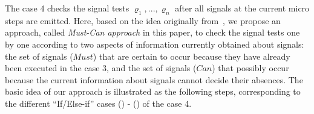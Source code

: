 \documentclass{fcs}
\newcommand{\rmn}[1]{(\romannumeral#1)}
\newcommand{\Must}[0]{\mathit{Must}}
\newcommand{\Cannot}[0]{\mathit{Cant}}
\newcommand{\Chk}[0]{\mathit{Chk}}
\newcommand{\Merge}[0]{\mathit{Mer}}
\newcommand{\rMerge}[0]{\mathit{rMer}}
\newcommand{\append}[0]{\triangleleft}
\newcommand{\Sigs}[0]{\mathit{Sig}}
\newcommand{\SV}[0]{\Xi}
\newcommand{\Can}[0]{\mathit{Can}}
\newcommand{\getCan}[0]{\mathit{getCan}}
\begin{document}

The case 4 checks the signal tests $\varrho_1,...,\varrho_n$ after all signals at the current micro steps are emitted.
Here, based on the idea originally from~\cite{Berry99}, we propose an approach, called \emph{Must-Can approach} in this paper, to check the signal tests one by one according to two aspects of information currently obtained about signals:
the set of signals ($\Must$) that are certain to occur because they have already been executed in the case 3, and
the set of signals ($\Can$) that possibly occur because the current information about signals cannot decide their absences.
The basic idea of our approach is illustrated as the following steps, corresponding to the different ``If/Else-if'' cases \rmn{1} - \rmn{4} of the case 4.
\end{document}
